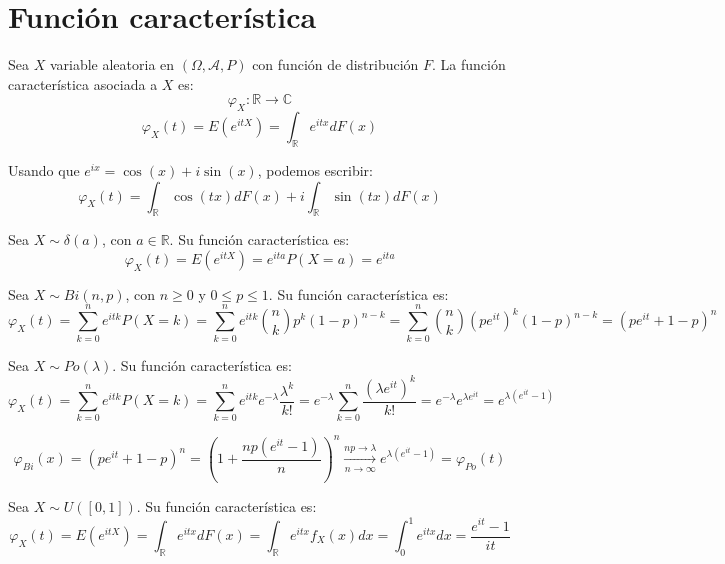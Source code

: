 \chapter{Función característica}
\begin{definition}
    Sea $X$ variable aleatoria en $(\Omega, \mathcal{A}, P)$ con función de distribución $F$.
    La función característica asociada a $X$ es:
    $$\varphi_X: \mathbb{R} \to \mathbb{C}$$
    $$\varphi_X(t) = E(e^{itX}) = \int_\mathbb{R} e^{itx}dF(x)$$
\end{definition}

\begin{remark}
    Usando que $e^{ix} = \cos(x) + i\sin(x)$, podemos escribir:
    $$\varphi_X(t) = \int_\mathbb{R} \cos(tx)dF(x) + i \int_\mathbb{R} \sin(tx)dF(x)$$
\end{remark}

\begin{example}
    Sea $X \sim \delta(a)$, con $a \in \mathbb{R}$.
    Su función característica es:
    $$\varphi_X(t) = E(e^{itX}) = e^{ita} P(X=a) = e^{ita}$$
\end{example}

\begin{example}
    Sea $X \sim Bi(n, p)$, con $n \geq 0$ y $0 \leq p \leq 1$.
    Su función característica es:
    $$\varphi_X(t) = \sum_{k=0}^n e^{itk} P(X=k) = \sum_{k=0}^n e^{itk} \binom{n}{k} p^k(1-p)^{n-k} = \sum_{k=0}^n \binom{n}{k} (pe^{it})^k(1-p)^{n-k} = (pe^{it} + 1 - p)^n$$
\end{example}

\begin{example}
    Sea $X \sim Po(\lambda)$.
    Su función característica es:
    $$\varphi_X(t) = \sum_{k=0}^n e^{itk} P(X=k) = \sum_{k=0}^n e^{itk}e^{-\lambda}\frac{\lambda^k}{k!} = e^{-\lambda} \sum_{k=0}^n \frac{(\lambda e^{it})^k}{k!} = e^{-\lambda}e^{\lambda e^{it}} = e^{\lambda(e^{it} - 1)}$$
\end{example}

\begin{remark}
    $$\varphi_{Bi}(x) = (pe^{it} + 1 - p)^n = \left( 1 + \frac{np(e^{it}-1)}{n} \right)^n \xrightarrow[n \to \infty]{np \to \lambda} e^{\lambda(e^{it} - 1)} = \varphi_{Po}(t)$$
\end{remark}

\begin{example}
    Sea $X \sim U([0, 1])$.
    Su función característica es:
    $$\varphi_X(t) = E(e^{itX}) = \int_\mathbb{R} e^{itx}dF(x) = \int_\mathbb{R} e^{itx}f_X(x)dx = \int_0^1 e^{itx}dx = \frac{e^{it}-1}{it}$$
\end{example}

